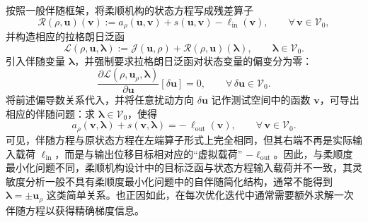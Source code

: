按照一般伴随框架，将柔顺机构的状态方程写成残差算子
\[
\mathcal{R}(\rho,\boldsymbol{u})(\boldsymbol{v}) := a_\rho(\boldsymbol{u},\boldsymbol{v}) + s(\boldsymbol{u},\boldsymbol{v}) - \ell_{\mathrm{in}}(\boldsymbol{v}), \qquad \forall\,\boldsymbol{v}\in\mathcal{V}_0,
\]
并构造相应的拉格朗日泛函
\[
\mathcal{L}(\rho,\boldsymbol{u},\boldsymbol{\lambda}) := \mathcal{J}(\boldsymbol{u},\rho)  + \mathcal{R}(\rho,\boldsymbol{u})(\boldsymbol{\lambda}),\qquad\boldsymbol{\lambda}\in\mathcal{V}_0.
\]
引入伴随变量 $\boldsymbol{\lambda}$，并强制要求拉格朗日泛函对状态变量的偏变分为零：
\[
\frac{\partial\mathcal{L}(\rho,\boldsymbol{u}_\rho,\boldsymbol{\lambda})} {\partial\boldsymbol{u}}[\delta\boldsymbol{u}] = 0, \qquad \forall\,\delta\boldsymbol{u}\in\mathcal{V}_0.
\]
将前述偏导数关系代入，并将任意扰动方向 $\delta\boldsymbol{u}$ 记作测试空间中的函数 $\boldsymbol{v}$，可导出相应的伴随问题：求 $\boldsymbol{\lambda}\in\mathcal{V}_0$，使得
\[
a_\rho(\boldsymbol{v},\boldsymbol{\lambda}) + s(\boldsymbol{v},\boldsymbol{\lambda}) = -\,\ell_{\mathrm{out}}(\boldsymbol{v}), \qquad \forall\,\boldsymbol{v}\in\mathcal{V}_0.
\]
可见，伴随方程与原状态方程在左端算子形式上完全相同，但其右端不再是实际输入载荷 $\ell_{\mathrm{in}}$，而是与输出位移目标相对应的“虚拟载荷” $-\ell_{\mathrm{out}}$。因此，与柔顺度最小化问题不同，柔顺机构设计中的目标泛函与状态方程输入载荷并不一致，其灵敏度分析一般不具有柔顺度最小化问题中的自伴随简化结构，通常不能得到 $\boldsymbol{\lambda}=\pm\boldsymbol{u}_\rho$ 这类简单关系。也正因如此，在每次优化迭代中通常需要额外求解一次伴随方程以获得精确梯度信息。


